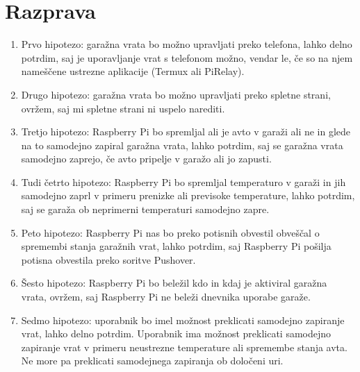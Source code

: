 \documentclass[11pt]{article}
\begin{document}
\section{Razprava}

\begin{enumerate}
  \item Prvo hipotezo: garažna vrata bo možno upravljati preko telefona, lahko delno potrdim, saj je uporavljanje vrat s telefonom možno, vendar le, če so na njem nameščene ustrezne aplikacije (Termux ali PiRelay).
  \item Drugo hipotezo: garažna vrata bo možno upravljati preko spletne strani, ovržem, saj mi spletne strani ni uspelo narediti.
  \item Tretjo hipotezo: Raspberry Pi bo spremljal ali je avto v garaži ali ne in glede na to samodejno zapiral garažna vrata, lahko potrdim, saj se garažna vrata samodejno zaprejo, če avto pripelje v garažo ali jo zapusti.
  \item Tudi četrto hipotezo: Raspberry Pi bo spremljal temperaturo v garaži in jih samodejno zaprl v primeru prenizke ali previsoke temperature, lahko potrdim, saj se garaža ob neprimerni temperaturi samodejno zapre.
  \item Peto hipotezo: Raspberry Pi nas bo preko potisnih obvestil obveščal o spremembi stanja garažnih vrat, lahko potrdim, saj Raspberry Pi pošilja potisna obvestila preko soritve Pushover.
  \item Šesto hipotezo: Raspberry Pi bo beležil kdo in kdaj je aktiviral garažna vrata, ovržem, saj Raspberry Pi ne beleži dnevnika uporabe garaže.
  \item Sedmo hipotezo: uporabnik bo imel možnost preklicati samodejno zapiranje vrat, lahko delno potrdim. Uporabnik ima možnost preklicati samodejno zapiranje vrat v primeru neustrezne temperature ali spremembe stanja avta. Ne more pa preklicati samodejnega zapiranja ob določeni uri.
\end{enumerate}
\end{document}
